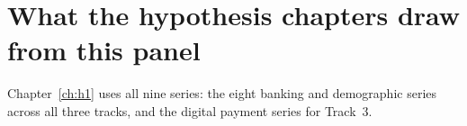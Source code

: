 \section{What the hypothesis chapters draw from this panel}
\label{sec:data-usage}

Chapter~\ref{ch:h1} uses all nine series: the eight banking and demographic series across all
three tracks, and the digital payment series for Track~3.

